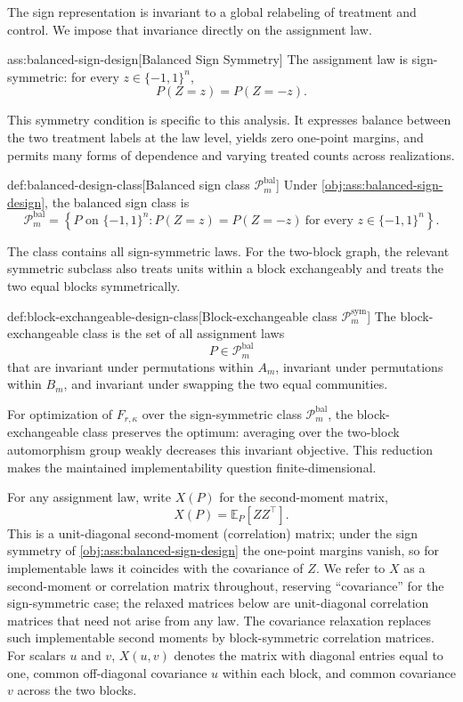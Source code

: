 The sign representation is invariant to a global relabeling of treatment and control. We impose that invariance directly on the assignment law.

\begin{assumptionv}{ass:balanced-sign-design}[Balanced Sign Symmetry]
The assignment law is sign-symmetric: for every \(z\in\{-1,1\}^n\),
\[
P(Z=z)=P(Z=-z).
\]
\end{assumptionv}

This symmetry condition is specific to this analysis. It expresses balance between the two treatment labels at the law level, yields zero one-point margins, and permits many forms of dependence and varying treated counts across realizations.

\begin{definitionv}{def:balanced-design-class}[Balanced sign class $\mathcal P_m^{\mathrm{bal}}$]
Under \cref{obj:ass:balanced-sign-design}, the balanced sign class is
\[
\mathcal P_m^{\mathrm{bal}}
=
\left\{
P \text{ on } \{-1,1\}^n :
P(Z=z)=P(Z=-z)\ \text{for every } z\in\{-1,1\}^n
\right\}.
\]
\end{definitionv}

The class  contains all sign-symmetric laws. For the two-block graph, the relevant symmetric subclass also treats units within a block exchangeably and treats the two equal blocks symmetrically.

\begin{definitionv}{def:block-exchangeable-design-class}[Block-exchangeable class $\mathcal P_m^{\mathrm{sym}}$]
The block-exchangeable class is the set of all assignment laws
\[
P\in \mathcal P_m^{\mathrm{bal}}
\]
that are invariant under permutations within $A_m$, invariant under permutations within $B_m$, and invariant under swapping the two equal communities.
\end{definitionv}

For optimization of $F_{r,\kappa}$ over the sign-symmetric class $\mathcal P_m^{\mathrm{bal}}$, the block-exchangeable class  preserves the optimum: averaging over the two-block automorphism group weakly decreases this invariant objective. This reduction makes the maintained implementability question finite-dimensional.

For any assignment law, write \(X(P)\) for the second-moment matrix,
\[
X(P)=\mathbb E_P[ZZ^\top].
\]
This is a unit-diagonal second-moment (correlation) matrix; under the sign symmetry of \cref{obj:ass:balanced-sign-design} the one-point margins vanish, so for implementable laws it coincides with the covariance of \(Z\). We refer to \(X\) as a second-moment or correlation matrix throughout, reserving ``covariance'' for the sign-symmetric case; the relaxed matrices below are unit-diagonal correlation matrices that need not arise from any law. The covariance relaxation replaces such implementable second moments by block-symmetric correlation matrices. For scalars \(u\) and \(v\), \(X(u,v)\) denotes the matrix with diagonal entries equal to one, common off-diagonal covariance \(u\) within each block, and common covariance \(v\) across the two blocks.

